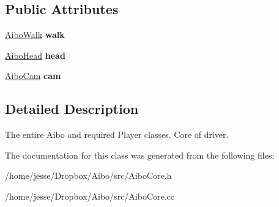 \subsection*{Public Attributes}
\begin{DoxyCompactItemize}
\item 
\hypertarget{classAiboCore_a0bfbdcab738086d571c8dd9936408221}{
\hyperlink{classAiboWalk}{AiboWalk} {\bfseries walk}}
\label{classAiboCore_a0bfbdcab738086d571c8dd9936408221}

\item 
\hypertarget{classAiboCore_a82f60f050d49dc500a23beff1c80d658}{
\hyperlink{classAiboHead}{AiboHead} {\bfseries head}}
\label{classAiboCore_a82f60f050d49dc500a23beff1c80d658}

\item 
\hypertarget{classAiboCore_ac299b12604a05d4be74eafac7162ba10}{
\hyperlink{classAiboCam}{AiboCam} {\bfseries cam}}
\label{classAiboCore_ac299b12604a05d4be74eafac7162ba10}

\end{DoxyCompactItemize}


\subsection{Detailed Description}
The entire Aibo and required Player classes. Core of driver. 

The documentation for this class was generated from the following files:\begin{DoxyCompactItemize}
\item 
/home/jesse/Dropbox/Aibo/src/AiboCore.h\item 
/home/jesse/Dropbox/Aibo/src/AiboCore.cc\end{DoxyCompactItemize}
